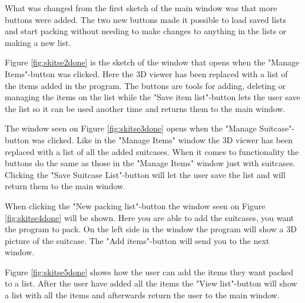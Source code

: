 
What was changed from the first sketch of the main window was that more buttons were added. The two new buttons made it possible to load saved lists and start packing without needing to make changes to anything in the lists or making a new list.


Figure \ref{fig:skitse2done} is the sketch of the window that opens when the "Manage Items"-button was clicked. Here the 3D viewer has been replaced with a list of the items added in the program. The buttons are tools for adding, deleting or managing the items on the list while the "Save item list"-button lets the user save the list so it can be used another time and returns them to the main window.


The window seen on Figure \ref{fig:skitse3done} opens when the "Manage Suitcase"-button was clicked. Like in the "Manage Items" window the 3D viewer has been replaced with a list of all the added suitcases. When it comes to functionality the buttons do the same as those in the "Manage Items" window just with suitcases. Clicking the "Save Suitcase List"-button will let the user save the list and will return them to the main window.


When clicking the "New packing list"-button the window seen on Figure \ref{fig:skitse4done} will be shown. Here you are able to add the suitcases, you want the program to pack. On the left side in the window the program will show a 3D picture of the suitcase. The "Add items"-button will send you to the next window.


Figure \ref{fig:skitse5done} shows how the user can add the items they want packed to a list. After the user have added all the items the "View list"-button will show a list with all the items and afterwards return the user to the main window.


